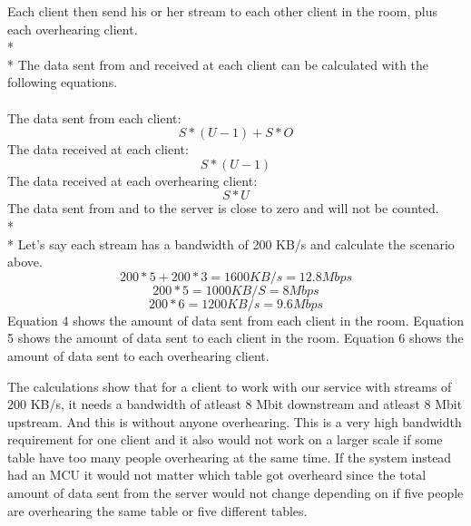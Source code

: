 \documentclass[12pt, titlepage]{article}
\begin{document}
Each client then send his or her stream to each other client in the room, plus each overhearing client.
\\*
\\*
The data sent from and received at each client can be calculated with the following equations.\\\\
The data sent from each client:
\begin{equation}
S*(U-1)+S*O
\end{equation}
The data received at each client: 
\begin{equation}
S*(U-1)
\end{equation}
The data received at each overhearing client:
\begin{equation}
S*U
\end{equation}
The data sent from and to the server is close to zero and will not be counted.
\\*\\*
Let's say each stream has a bandwidth of 200 KB/s and calculate the scenario above.
\begin{equation}
200*5 + 200*3 = 1600 KB/s = 12.8 Mbps
\end{equation}
\begin{equation}
200*5 = 1000 KB/S  = 8 Mbps
\end{equation}
\begin{equation}
200*6 = 1200 KB/s = 9.6 Mbps
\end{equation}
Equation 4 shows the amount of data sent from each client in the room. Equation 5 shows the amount of data sent to each client in the room. Equation 6 shows the amount of data sent to each overhearing client.


The calculations show that for a client to work with our service with streams of $200$ KB/s, it needs a bandwidth of atleast 8 Mbit downstream and atleast 8 Mbit upstream. And this is without anyone overhearing. This is a very high bandwidth requirement for one client and it also would not work on a larger scale if some table have too many people overhearing at the same time. If the system instead had an MCU it would not matter which table got overheard since the total amount of data sent from the server would not change depending on if five people are overhearing the same table or five different tables.
\end{document}
